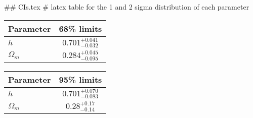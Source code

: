 ## CIs.tex
# latex table for the 1 and 2 sigma distribution of each parameter

\begin{tabular} { l  c}
 Parameter &  68\% limits\\
\hline
{\boldmath$h              $} & $0.701^{+0.041}_{-0.032}   $\\
{\boldmath$\Omega_m       $} & $0.284^{+0.045}_{-0.095}   $\\
\hline
\end{tabular}

\begin{tabular} { l  c}
 Parameter &  95\% limits\\
\hline
{\boldmath$h              $} & $0.701^{+0.070}_{-0.083}   $\\
{\boldmath$\Omega_m       $} & $0.28^{+0.17}_{-0.14}      $\\
\hline
\end{tabular}
